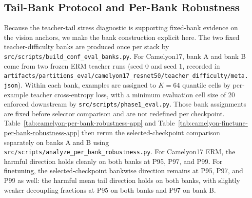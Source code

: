 \begin{table}[h]
  \centering
  \small
  \resizebox{\columnwidth}{!}{}
  \caption{
    Paired bootstrap intervals for the main hazard anchors.
    These intervals complement the selected-checkpoint deltas in Table~\ref{tab:core-cases} by making the uncertainty on held-out loss, reliability, and calibration explicit.
  }
  \label{tab:core-case-uncertainty}
\end{table}

\subsection{Tail-Bank Protocol and Per-Bank Robustness}
\label{app:tail-bank-robustness}
Because the teacher-tail stress diagnostic is supporting fixed-bank evidence on the vision anchors, we make the bank construction explicit here.
The two fixed teacher-difficulty banks are produced once per stack by \texttt{src/scripts/build\_conf\_eval\_banks.py}.
For Camelyon17, bank A and bank B come from two frozen ERM teacher runs (seed 0 and seed 1, recorded in \texttt{artifacts/partitions\_eval/camelyon17\_resnet50/teacher\_difficulty/meta.json}).
Within each bank, examples are assigned to $K=64$ quantile cells by per-example teacher cross-entropy loss, with a minimum evaluation cell size of 20 enforced downstream by \texttt{src/scripts/phase1\_eval.py}.
Those bank assignments are fixed before selector comparison and are not redefined per checkpoint.
Table~\ref{tab:camelyon-per-bank-robustness-app} and Table~\ref{tab:camelyon-finetune-per-bank-robustness-app} then rerun the selected-checkpoint comparison separately on banks A and B using \texttt{src/scripts/analyze\_per\_bank\_robustness.py}.
For Camelyon17 ERM, the harmful direction holds cleanly on both banks at P95, P97, and P99.
For finetuning, the selected-checkpoint bankwise direction remains at P95, P97, and P99 as well: the harmful mean tail direction holds on both banks, with slightly weaker decoupling fractions at P95 on both banks and P97 on bank B.

\begin{table}[h]
  \centering
  \small
  \resizebox{\columnwidth}{!}{}
  \caption{
    Camelyon17 ERM per-bank robustness for the teacher-difficulty tail metric.
    Rows report mean proxy and tail deltas relative to the ERM baseline separately on banks A and B.
    The harmful teacher-difficulty tail direction holds on both banks, so the main P95 result is not driven by averaging across a single favorable bank.
    For ERM, the bankwise tail deltas coincide after rounding in the saved artifact, while proxy deltas differ by bank.
  }
  \label{tab:camelyon-per-bank-robustness-app}
\end{table}


